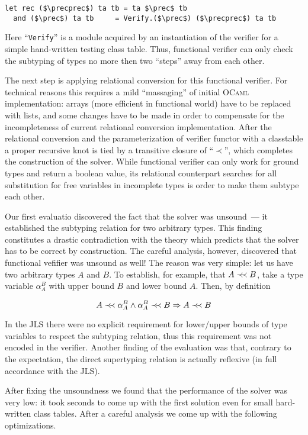 \begin{lstlisting}[language=ocanren,mathescape=true]
  let rec ($\precprec$) ta tb = ta $\prec$ tb 
  and ($\prec$) ta tb     = Verify.($\prec$) ($\precprec$) ta tb
\end{lstlisting}

Here ``\lstinline|Verify|'' is a module acquired by an instantiation of the verifier for a simple hand-written testing class table.
Thus, functional verifier can only check the subtyping of types no more then two ``steps'' away from each other.

The next step is applying relational conversion for this functional verifier. For technical reasons this requires a mild
``massaging'' of initial \textsc{OCaml} implementation: arrays (more efficient in functional world) have to be replaced
with lists, and some changes have to be made in order to compensate for the incompleteness of current relational
conversion implementation.
After the relational conversion and the parameterization of verifier functor with a classtable a proper recursive knot is tied by a transitive closure of ``$\prec$'', which
completes the construction of the solver. While functional verifier can only work for ground types and return a boolean value, its relational counterpart
searches for all substitution for free variables in incomplete types is order to make them subtype each other.

Our first evaluatio discovered the fact that the solver was unsound~--- it established the subtyping relation for two arbitrary types. This finding constitutes a drastic
contradiction with the theory which predicts that the solver has to be correct by construction. The careful analysis, however, discovered that functional
vefifier was unsound as well! The reason was very simple: let us have two arbitrary types $A$ and $B$. To establish, for example, that $A \prec\mathrel{\mkern-5mu}\prec B$, take a
type variable $\alpha^B_A$ with upper bound $B$ and lower bound $A$. Then, by definition

\[
A\prec\mathrel{\mkern-5mu}\prec \alpha^B_A \wedge \alpha^B_A\prec\mathrel{\mkern-5mu}\prec B \Rightarrow A\prec\mathrel{\mkern-5mu}\prec B
\]

In the JLS there were no explicit requirement for lower/upper bounds of type variables to respect the subtyping relation, thus this requirement was not
encoded in the verifier. Another finding of the evaluation was that, contrary to the expectation, the direct supertyping relation is actually
reflexive (in full accordance with the JLS).

After fixing the unsoundness we found that the performance of the solver was very low: it took seconds to come up with the first solution even for
small hard-written class tables. After a careful analysis we come up with the following optimizations.

